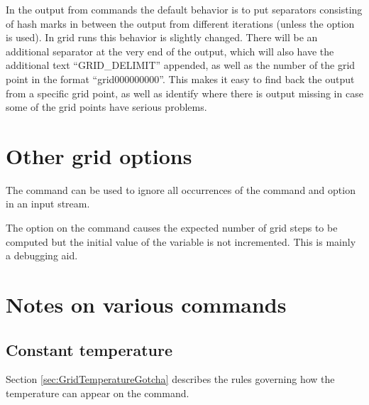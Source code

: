 In the output from  commands the default behavior is to put
separators consisting of hash marks in between the output from different
iterations (unless the  option is used). In grid runs this
behavior is slightly changed. There will be an additional separator at the
very end of the output, which will also have the additional text
``GRID\_DELIMIT'' appended, as well as the number of the grid point in the
format ``grid000000000''. This makes it easy to find back the output from a
specific grid point, as well as identify where there is output missing in case
some of the grid points have serious problems.

\section{Other grid options}

The  command can be used to ignore all
occurrences of the  command and 
option in an input stream.

The  option on the  command
causes the expected number of grid
steps to be computed but the initial value of the variable is not
incremented.
This is mainly a debugging aid. 

\section{Notes on various commands}

\subsection{Constant temperature}
Section \ref{sec:GridTemperatureGotcha}
describes the rules governing how the temperature can
appear on the  command.
